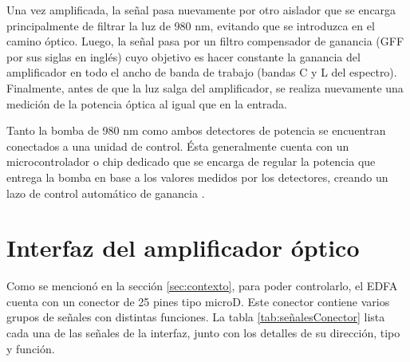 Una vez amplificada, la señal pasa nuevamente por otro aislador que se encarga principalmente de filtrar la luz de 980 nm, evitando que se introduzca en el camino óptico. Luego, la señal pasa por un filtro compensador de ganancia (GFF por sus siglas en inglés) cuyo objetivo es hacer constante la ganancia del amplificador en todo el ancho de banda de trabajo (bandas C y L del espectro). Finalmente, antes de que la luz salga del amplificador, se realiza nuevamente una medición de la potencia óptica al igual que en la entrada.

Tanto la bomba de 980 nm como ambos detectores de potencia se encuentran conectados a una unidad de control. Ésta generalmente cuenta con un microcontrolador o chip dedicado que se encarga de regular la potencia que entrega la bomba en base a los valores medidos por los detectores, creando un lazo de control automático de ganancia \citep{WEBSITE:EDFA1}\citep{WEBSITE:EDFA2}.

\section{Interfaz del amplificador óptico}
\label{sec:intAmp}

Como se mencionó en la sección \ref{sec:contexto}, para poder controlarlo, el EDFA cuenta con un conector de 25 pines tipo microD. Este conector contiene varios grupos de señales con distintas funciones. La tabla \ref{tab:señalesConector} lista cada una de las señales de la interfaz, junto con los detalles de su dirección, tipo y función.

